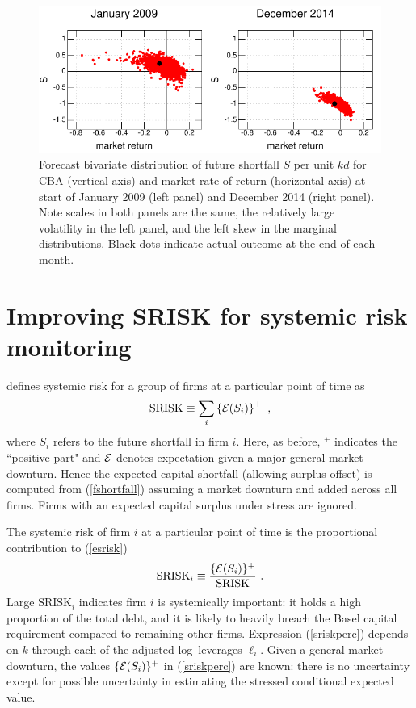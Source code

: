 \documentclass[authoryear]{elsarticle}
\newcommand{\Ex}{{\cal E}}
\newcommand{\Es}{\Ex}
\newcommand{\sr}{\ensuremath{\mathrm{SRISK}}}
\newcommand{\eref}[1]{(\ref{#1})}
\newcommand{\be}[1]{\begin{equation}\label{#1}}
\newcommand{\ee}{\end{equation}}
\begin{document}
\begin{figure}[htbp]
\begin{center}
\includegraphics[width=12cm]{figures/figCBA.pdf}
\caption{Forecast bivariate distribution of future shortfall $S$ per unit $kd$  for CBA (vertical axis) and market rate of return (horizontal axis) at start of January 2009 (left panel)  and December 2014 (right panel). Note scales in both panels are the same, the relatively large volatility in the left panel, and the left skew in the  marginal distributions.  Black dots indicate actual  outcome at the end of each month.}\label{simulation}
\end{center}
\end{figure}

\section{Improving SRISK for systemic risk monitoring}\label{srisk}

 \cite{brownlees2015} defines  systemic risk for a group of firms  at a particular point of time as
\be{esrisk}
\sr\equiv \sum_i \left\{\Es(S_i)\right\}^+ \ ,
\ee
where $S_i$ refers to the future shortfall in firm $i$.  Here, as before, $^+$ indicates the ``positive part"   and  $\Es$ denotes expectation given a major general market downturn. Hence the expected capital shortfall (allowing surplus offset) is computed from \eref{fshortfall} assuming a market downturn and added across all firms. Firms with an expected capital surplus under stress are ignored. 

The systemic risk of firm $i$ at a particular point of time is  \citep{brownlees2015} the proportional contribution to \eref{esrisk}
\be{sriskperc}
\sr_i\equiv\frac{\{\Ex(S_i)\}^+}{\sr}\ .
 \ee
Large $\mathrm{SRISK}_{i}$ indicates firm $i$ is systemically important: it holds a high proportion of the total debt, and it is likely to heavily breach the Basel capital requirement compared to remaining other firms.  Expression \eref{sriskperc} depends on $k$ through each of the adjusted log--leverages $\ell_i$.   Given a general market downturn, the values $\{\Es(S_i)\}^+$  in \eref{sriskperc} are known:  there is no uncertainty except for possible  uncertainty in estimating the stressed conditional  expected value.
\end{document}
